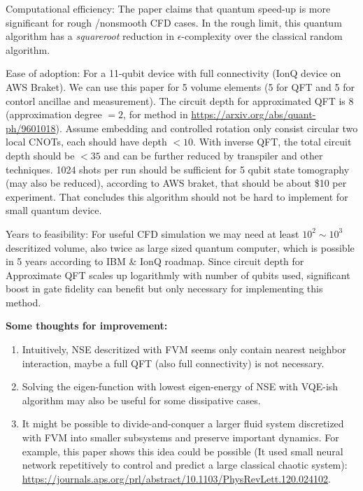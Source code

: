 \documentclass{article}
\begin{document}
Computational efficiency:
The paper claims that quantum speed-up is more significant for rough /nonsmooth CFD cases. In the rough limit, this quantum algorithm  has a \textit{squareroot} reduction in $\epsilon$-complexity over the classical random algorithm. 


Ease of adoption: For a 11-qubit device with full connectivity (IonQ device on AWS Braket). We can use this paper for 5 volume elements (5 for QFT and 5 for contorl ancillae and measurement). The circuit depth for approximated QFT is 8 (approximation degree $=2$, for method in \url{https://arxiv.org/abs/quant-ph/9601018}). Assume embedding and controlled rotation only consist circular two local CNOTs, each should have depth $<10$. With inverse QFT, the total circuit depth should be $<35$ and can be further reduced by transpiler and other techniques. 1024 shots per run should be sufficient for 5 qubit state tomography (may also be reduced), according to AWS braket, that should be about \$10 per experiment. That concludes this algorithm should not be hard to implement for small quantum device.


Years to feasibility: For useful CFD simulation we may need at least $10^2\sim 10^3$ descritized volume, also twice as large sized quantum computer, which is possible in 5 years according to IBM \& IonQ roadmap. Since circuit depth for Approximate QFT scales up logarithmly with number of qubits used, significant boost in gate fidelity can benefit but only necessary for implementing this method.

\textbf{Some thoughts for improvement:}
\begin{enumerate}
    \item Intuitively, NSE descritized with FVM seems only contain nearest neighbor interaction, maybe a full QFT (also full connectivity) is not necessary.
    \item Solving the eigen-function with lowest eigen-energy of NSE with VQE-ish algorithm may also be useful for some dissipative cases.
    \item It might be possible to divide-and-conquer a larger fluid system discretized with FVM into smaller subsystems and preserve important dynamics. For example, this paper shows this idea could be possible (It used small neural network repetitively to control and predict a large classical chaotic system): \url{https://journals.aps.org/prl/abstract/10.1103/PhysRevLett.120.024102}.
\end{enumerate}


\end{document}
